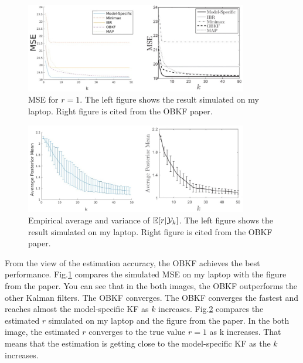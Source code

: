\begin{figure}[H]
    \begin{center}
    \includegraphics[width=9.7cm]{img/r1_mse.eps}
    \caption{MSE for $r=1$. The left figure shows the result simulated on my laptop. Right figure is cited from the OBKF paper\cite{Dehghannasiri2018}.}
    \label{fig:mse_r1}
    \end{center}
\end{figure}
\begin{figure}[H]
    \begin{center}
    \includegraphics[width=9.7cm]{img/r1_mean.eps}
    \caption{Empirical average and variance of $\mathbb{E}[r|\mathcal{Y}_k]$. The left figure shows the result simulated on my laptop. Right figure is cited from the OBKF paper\cite{Dehghannasiri2018}.}
    \label{fig:mean_r1}
    \end{center}
\end{figure}

From the view of the estimation accuracy, the OBKF achieves the best performance. Fig.\ref{fig:mse_r1} compares the simulated MSE on my laptop with the figure from the paper. You can see that in the both images, the OBKF outperforms the other Kalman filters. The OBKF converges. The OBKF converges the fastest and reaches almost the model-specific KF as $k$ increases. Fig.\ref{fig:mean_r1} compares the estimated $r$ simulated on my laptop and the figure from the paper. In the both image, the estimated $r$ converges to the true value $r=1$ as k increases. That means that the estimation is getting close to the model-specific KF as the $k$ increases.

